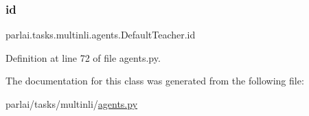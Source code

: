 \subsubsection{\texorpdfstring{id}{id}}
{\footnotesize\ttfamily parlai.\+tasks.\+multinli.\+agents.\+Default\+Teacher.\+id}



Definition at line 72 of file agents.\+py.



The documentation for this class was generated from the following file\+:\begin{DoxyCompactItemize}
\item 
parlai/tasks/multinli/\hyperlink{parlai_2tasks_2multinli_2agents_8py}{agents.\+py}\end{DoxyCompactItemize}
